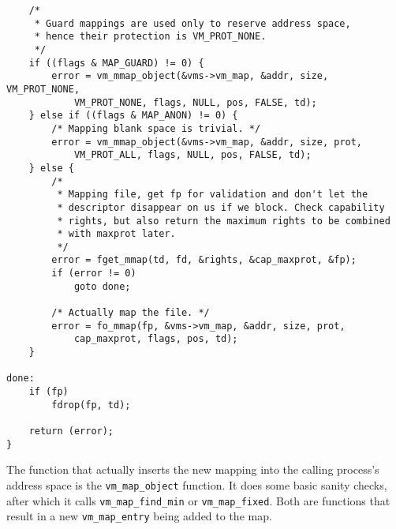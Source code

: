 \documentclass[shortabstract, english]{iithesis}
\newenvironment{code}{}{}
\begin{document}
\begin{code}
\begin{verbatim}
    /*
     * Guard mappings are used only to reserve address space,
     * hence their protection is VM_PROT_NONE.
     */
    if ((flags & MAP_GUARD) != 0) {
        error = vm_mmap_object(&vms->vm_map, &addr, size, VM_PROT_NONE,
            VM_PROT_NONE, flags, NULL, pos, FALSE, td);
    } else if ((flags & MAP_ANON) != 0) {
        /* Mapping blank space is trivial. */
        error = vm_mmap_object(&vms->vm_map, &addr, size, prot,
            VM_PROT_ALL, flags, NULL, pos, FALSE, td);
    } else {
        /*
         * Mapping file, get fp for validation and don't let the
         * descriptor disappear on us if we block. Check capability
         * rights, but also return the maximum rights to be combined
         * with maxprot later.
         */
        error = fget_mmap(td, fd, &rights, &cap_maxprot, &fp);
        if (error != 0)
            goto done;

        /* Actually map the file. */
        error = fo_mmap(fp, &vms->vm_map, &addr, size, prot,
            cap_maxprot, flags, pos, td);
    }

done:
    if (fp)
        fdrop(fp, td);

    return (error);
}
\end{verbatim}
\end{code}

The function that actually inserts the new mapping into the calling process's
address space is the \texttt{vm_map_object} function. It does some basic
sanity checks, after which it calls \texttt{vm_map_find_min} or
\texttt{vm_map_fixed}. Both are functions that result in a new
\texttt{vm_map_entry} being added to the map.
\end{document}
